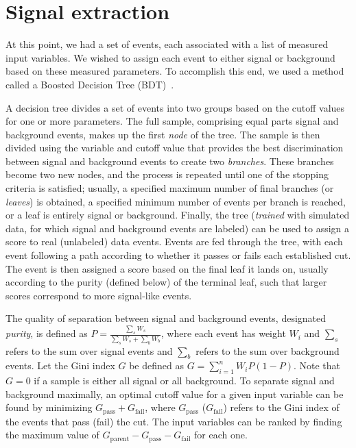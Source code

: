 \section{Signal extraction}
\label{section:8_signal}
At this point, we had a set of events, each associated with a list of measured
input variables. We wished to assign each event to either signal or background
based on these measured parameters. To accomplish this end, we used a method called a
Boosted Decision Tree (BDT)~\cite{bdt_nim}.

A decision tree divides a set of events into two groups based on the cutoff values
for one or more parameters. The full sample, comprising equal parts signal and background
events, makes up the first \emph{node} of the tree. The sample is then divided using
the variable and cutoff value that provides the best discrimination between
signal and background events to create two \emph{branches}. These branches
become two new nodes, and the process is repeated until one of the stopping
criteria is satisfied; usually, a specified maximum number of final branches
(or \emph{leaves}) is obtained, a specified minimum number of events per branch
is reached, or a leaf is entirely signal or background. Finally, the tree
(\emph{trained} with simulated data, for which signal and background events are
labeled) can be used to assign a score to real (unlabeled) data events. Events
are fed through the tree, with each event following a path according to whether it passes or
fails each established cut. The event is then assigned a score based on the final leaf it
lands on, usually according to the purity (defined below) of the terminal leaf,
such that larger scores correspond to more signal-like events.

The quality of separation between signal and background events, designated
\emph{purity}, is defined as $P=\frac{\sum_sW_s}{\sum_sW_s+\sum_bW_b}$, where
each event has weight $W_i$ and $\sum_s$ refers to the sum over signal events
and $\sum_b$ refers to the sum over background events. Let the Gini index $G$ be
defined as $G=\sum_{i=1}^n W_i P(1-P)$. Note that $G=0$ if a sample is either
all signal or all background. To separate signal and background maximally, an
optimal cutoff value for a given input variable can be found by
minimizing $G_\text{pass} + G_\text{fail}$, where $G_\text{pass}$
($G_\text{fail}$) refers to the Gini index of the events that pass (fail) the
cut. The input variables can be ranked by finding the maximum value of
$G_\text{parent} - G_\text{pass} - G_\text{fail}$ for each one.

